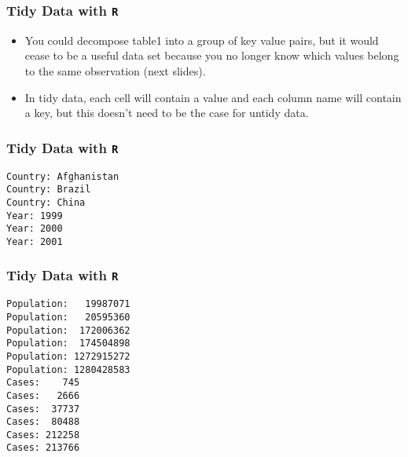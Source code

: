 \documentclass[TIDYMASTER.tex]{subfiles}
\begin{document}
\begin{frame}[fragile]
	\frametitle{Tidy Data with \texttt{R}}
	\Large
\begin{itemize}
%

\item You could decompose table1 into a group of key value pairs, but it would cease to be a useful data set because you no longer know which values belong to the same observation (next slides).
\item In tidy data, each cell will contain a value and each column name will contain a key, but this doesn’t need to be the case for untidy data.
\end{itemize}
\end{frame}
\begin{frame}[fragile]
	\frametitle{Tidy Data with \texttt{R}}
	\Large
\begin{verbatim}
Country: Afghanistan
Country: Brazil
Country: China
Year: 1999
Year: 2000
Year: 2001
\end{verbatim}
\end{frame}
\begin{frame}[fragile]
	\frametitle{Tidy Data with \texttt{R}}
	\Large
\begin{verbatim}
Population:   19987071
Population:   20595360
Population:  172006362
Population:  174504898
Population: 1272915272
Population: 1280428583
Cases:    745
Cases:   2666
Cases:  37737
Cases:  80488
Cases: 212258
Cases: 213766
\end{verbatim}	

\end{frame}
%
%
%
\end{document}
